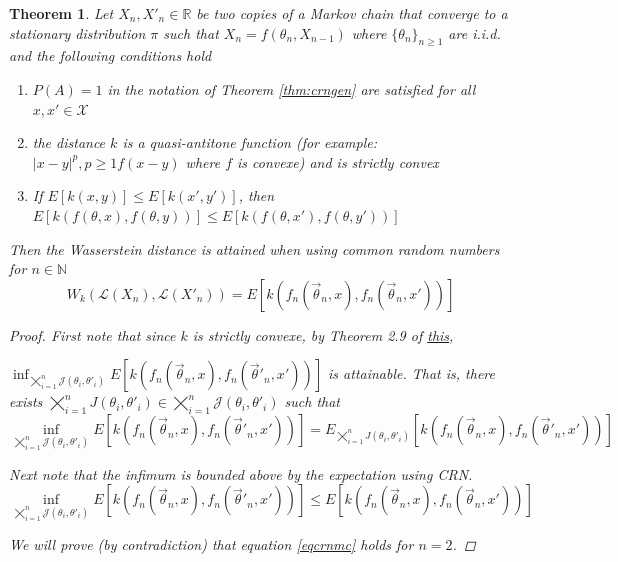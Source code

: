 \documentclass{article}
\theoremstyle{plain}%
\newtheorem{theorem}{Theorem}[section]
\theoremstyle{definition}
\theoremstyle{remark}
\begin{document}
	\begin{theorem}\label{thm:crnmc}
		Let $X_n,X'_n\in \mathbb{R}$ be two copies of a Markov chain that converge to a stationary distribution $\pi$ such that $X_n=f(\theta_n,X_{n-1})$ where $\{\theta_n\}_{n\geq 1}$ are i.i.d. and the following conditions hold
		\begin{enumerate}
			\item $P(A)=1$ in the notation of Theorem \ref{thm:crngen} are satisfied for all $x,x'\in\mathcal{X}$ %
			\item the distance $k$ is a quasi-antitone function (for example: $|x-y|^p, p\geq 1 f(x-y)$ where $f$ is convexe) and is strictly convex
			\item If $E[k(x,y)]\leq E[k(x',y')]$, then $E[k(f(\theta,x),f(\theta,y))]\leq E[k(f(\theta,x'),f(\theta,y'))]$
		\end{enumerate}
		Then the Wasserstein distance is attained when using common random numbers for $n\in\mathbb{N}$
		\begin{equation}\label{eqcrnmc}
			W_{k}(\mathcal{L}(X_n),\mathcal{L}(X'_n))= %
			E[k(f_n(\vec{\theta}_n,x),f_n(\vec{\theta}_n,x'))]
		\end{equation}
		\begin{proof}
			First note that since $k$ is strictly convexe, by Theorem 2.9 of \href{https://link.springer.com/book/10.1007/978-3-319-20828-2}{this}, 
			
			$\inf_{\bigtimes_{i=1}^n \mathcal{J}(\theta_i,\theta'_i)}E[k(f_n(\vec{\theta}_n,x),f_n(\vec{\theta}'_n,x'))]$ is attainable. That is, there exists $\bigtimes_{i=1}^n J(\theta_i,\theta'_i)\in \bigtimes_{i=1}^n \mathcal{J}(\theta_i,\theta'_i)$ such that $$\inf_{\bigtimes_{i=1}^n \mathcal{J}(\theta_i,\theta'_i)}E[k(f_n(\vec{\theta}_n,x),f_n(\vec{\theta}'_n,x'))]=E_{\bigtimes_{i=1}^n J(\theta_i,\theta'_i)}[k(f_n(\vec{\theta}_n,x),f_n(\vec{\theta}'_n,x'))]$$
			
			Next note that the infimum is bounded above by the expectation using CRN.
			$$\inf_{\bigtimes_{i=1}^n \mathcal{J}(\theta_i,\theta'_i)}E[k(f_n(\vec{\theta}_n,x),f_n(\vec{\theta}'_n,x'))]\leq E[k(f_n(\vec{\theta}_n,x),f_n(\vec{\theta}_n,x'))]$$
			
			We will prove (by contradiction) that equation \ref{eqcrnmc} holds for $n=2$. 
			

\end{proof}
\end{theorem}
\end{document}
